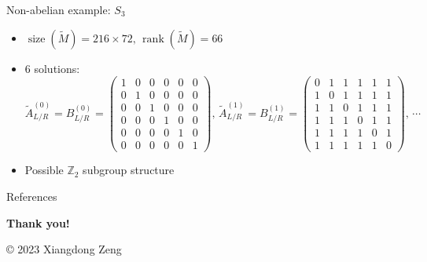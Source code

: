 \documentclass{fdubeamer}
\newcommand{\1}{\mathbb{1}}
\newcommand{\Z}{\mathbb{Z}}
\begin{document}
\begin{frame}{Non-abelian example: \texorpdfstring{$S_3$}{𝑆₃}}
\begin{itemize}
    \begin{itemize}
      \item $\operatorname{size}(\tilde{M})=216\times72, \, \operatorname{rank}(\tilde{M})=66$
      \item 6 solutions:
        $
          \tilde{A}^{(0)}_{L/R} = B^{(0)}_{L/R} = \left( \begin{smallmatrix}
            1 & 0 & 0 & 0 & 0 & 0 \\
            0 & 1 & 0 & 0 & 0 & 0 \\
            0 & 0 & 1 & 0 & 0 & 0 \\
            0 & 0 & 0 & 1 & 0 & 0 \\
            0 & 0 & 0 & 0 & 1 & 0 \\
            0 & 0 & 0 & 0 & 0 & 1
          \end{smallmatrix} \right)\!, \,
          \tilde{A}^{(1)}_{L/R} = B^{(1)}_{L/R} = \left( \begin{smallmatrix}
            0 & 1 & 1 & 1 & 1 & 1 \\
            1 & 0 & 1 & 1 & 1 & 1 \\
            1 & 1 & 0 & 1 & 1 & 1 \\
            1 & 1 & 1 & 0 & 1 & 1 \\
            1 & 1 & 1 & 1 & 0 & 1 \\
            1 & 1 & 1 & 1 & 1 & 0
          \end{smallmatrix} \right)\!, \, \cdots
        $
      \item Possible $\Z_2$ subgroup structure
    \end{itemize}
\end{itemize}

\end{frame}

\begin{frame}{References}
  \tiny
  
\end{frame}

\begingroup
  \begin{frame}[plain]
    \vfill
    \begin{center}
      \color{white}
      \LARGE
      \textbf{Thank you!} \par
      \vspace{6em}
      \tiny
      \copyright{} 2023 Xiangdong Zeng
    \end{center}
    \vspace{-8em}
  \end{frame}
\endgroup
\end{document}
